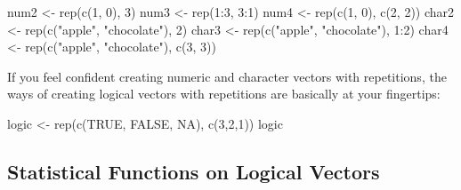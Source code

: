 \documentclass[
]{book}
\newenvironment{Shaded}{\begin{snugshade}}{\end{snugshade}}
\newcommand{\ConstantTok}[1]{\textcolor[rgb]{0.00,0.00,0.00}{#1}}
\newcommand{\DecValTok}[1]{\textcolor[rgb]{0.00,0.00,0.81}{#1}}
\newcommand{\FunctionTok}[1]{\textcolor[rgb]{0.00,0.00,0.00}{#1}}
\newcommand{\NormalTok}[1]{#1}
\newcommand{\OtherTok}[1]{\textcolor[rgb]{0.56,0.35,0.01}{#1}}
\newcommand{\SpecialCharTok}[1]{\textcolor[rgb]{0.00,0.00,0.00}{#1}}
\newcommand{\StringTok}[1]{\textcolor[rgb]{0.31,0.60,0.02}{#1}}
\begin{document}
\begin{Shaded}
\begin{Highlighting}[]
\NormalTok{num2 }\OtherTok{\textless{}{-}} \FunctionTok{rep}\NormalTok{(}\FunctionTok{c}\NormalTok{(}\DecValTok{1}\NormalTok{, }\DecValTok{0}\NormalTok{), }\DecValTok{3}\NormalTok{)}
\NormalTok{num3 }\OtherTok{\textless{}{-}} \FunctionTok{rep}\NormalTok{(}\DecValTok{1}\SpecialCharTok{:}\DecValTok{3}\NormalTok{, }\DecValTok{3}\SpecialCharTok{:}\DecValTok{1}\NormalTok{)}
\NormalTok{num4 }\OtherTok{\textless{}{-}} \FunctionTok{rep}\NormalTok{(}\FunctionTok{c}\NormalTok{(}\DecValTok{1}\NormalTok{, }\DecValTok{0}\NormalTok{), }\FunctionTok{c}\NormalTok{(}\DecValTok{2}\NormalTok{, }\DecValTok{2}\NormalTok{))}
\NormalTok{char2 }\OtherTok{\textless{}{-}} \FunctionTok{rep}\NormalTok{(}\FunctionTok{c}\NormalTok{(}\StringTok{"apple"}\NormalTok{, }\StringTok{"chocolate"}\NormalTok{), }\DecValTok{2}\NormalTok{)}
\NormalTok{char3 }\OtherTok{\textless{}{-}} \FunctionTok{rep}\NormalTok{(}\FunctionTok{c}\NormalTok{(}\StringTok{"apple"}\NormalTok{, }\StringTok{"chocolate"}\NormalTok{), }\DecValTok{1}\SpecialCharTok{:}\DecValTok{2}\NormalTok{)}
\NormalTok{char4 }\OtherTok{\textless{}{-}} \FunctionTok{rep}\NormalTok{(}\FunctionTok{c}\NormalTok{(}\StringTok{"apple"}\NormalTok{, }\StringTok{"chocolate"}\NormalTok{), }\FunctionTok{c}\NormalTok{(}\DecValTok{3}\NormalTok{, }\DecValTok{3}\NormalTok{))}
\end{Highlighting}
\end{Shaded}

If you feel confident creating numeric and character vectors with repetitions, the ways of creating logical vectors with repetitions are basically at your fingertips:

\begin{Shaded}
\begin{Highlighting}[]
\NormalTok{logic }\OtherTok{\textless{}{-}} \FunctionTok{rep}\NormalTok{(}\FunctionTok{c}\NormalTok{(}\ConstantTok{TRUE}\NormalTok{, }\ConstantTok{FALSE}\NormalTok{, }\ConstantTok{NA}\NormalTok{), }\FunctionTok{c}\NormalTok{(}\DecValTok{3}\NormalTok{,}\DecValTok{2}\NormalTok{,}\DecValTok{1}\NormalTok{))}
\NormalTok{logic}
\end{Highlighting}
\end{Shaded}

\hypertarget{functions-logi}{%
\subsection{Statistical Functions on Logical Vectors}\label{functions-logi}}
\end{document}
